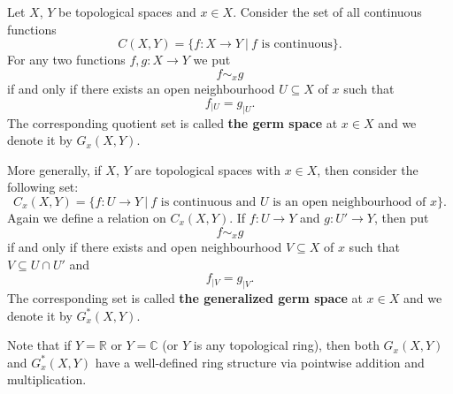 \documentclass[12pt]{article}
\begin{document}
Let $X$, $Y$ be topological spaces and $x\in X$. Consider the set of all continuous functions
$$C(X,Y)=\{f:X\to Y\ |\ f\mbox{ is continuous}\}.$$
For any two functions $f,g:X\to Y$ we put
$$f\sim_{x} g$$
if and only if there exists an open neighbourhood $U\subseteq X$ of $x$ such that
$$f_{|U}=g_{|U}.$$
The corresponding quotient set is called \textbf{the germ space} at $x\in X$ and we denote it by $G_x(X,Y)$.

More generally, if $X$, $Y$ are topological spaces with $x\in X$, then consider the following set:
$$C_x(X,Y)=\{f:U\to Y\ |\ f\mbox{ is continuous and }U\mbox{ is an open neighbourhood of }x\}.$$
Again we define a relation on $C_x(X,Y)$. If $f:U\to Y$ and $g:U'\to Y$, then put
$$f\sim_{x} g$$
if and only if there exists and open neighbourhood $V\subseteq X$ of $x$ such that $V\subseteq U\cap U'$ and
$$f_{|V}=g_{|V}.$$
The corresponding set is called \textbf{the generalized germ space} at $x\in X$ and we denote it by $G_x^*(X,Y)$.

Note that if $Y=\mathbb{R}$ or $Y=\mathbb{C}$ (or $Y$ is any topological ring), then both $G_x(X,Y)$ and $G_x^*(X,Y)$ have a well-defined ring structure via pointwise addition and multiplication.
\end{document}
